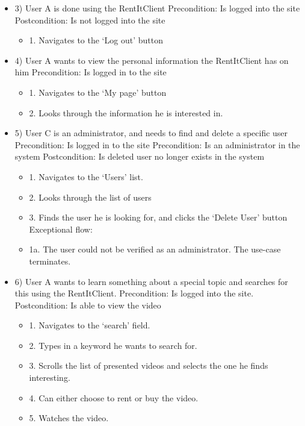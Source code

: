 \begin{itemize}
\item 3)
User A is done using the RentItClient
\newline Precondition: Is logged into the site
\newline Postcondition: Is not logged into the site
\begin{itemize}
	\item 1. Navigates to the ‘Log out’ button
\end{itemize}

\item 4)
User A wants to view the personal information the RentItClient has on him
\newline Precondition: Is logged in to the site
\begin{itemize}
    \item 1. Navigates to the ‘My page’ button
    \item 2. Looks through the information he is interested in.
\end{itemize}

\item 5)
User C is an administrator, and needs to find and delete a specific user
\newline Precondition: Is logged in to the site
\newline Precondition: Is an administrator in the system
\newline Postcondition: Is deleted user no longer exists in the system
\begin{itemize}
    \item 1. Navigates to the ‘Users’ list.
    \item 2. Looks through the list of users
    \item 3. Finds the user he is looking for, and clicks the ‘Delete User’ button
\newline Exceptional flow:
    \item 1a. The user could not be verified as an administrator. The use-case terminates.
\end{itemize}

\item 6)
User A wants to learn something about a special topic and searches for this using the RentItClient. 
\newline Precondition: Is logged into the site.
\newline Postcondition: Is able to view the video
\begin{itemize}
    \item 1. Navigates to the ‘search’ field. 
    \item 2. Types in a keyword he wants to search for.
    \item 3. Scrolls the list of presented videos and selects the one he finds interesting. 
    \item 4. Can either choose to rent or buy the video.
    \item 5. Watches the video.
\end{itemize}


\end{itemize}
